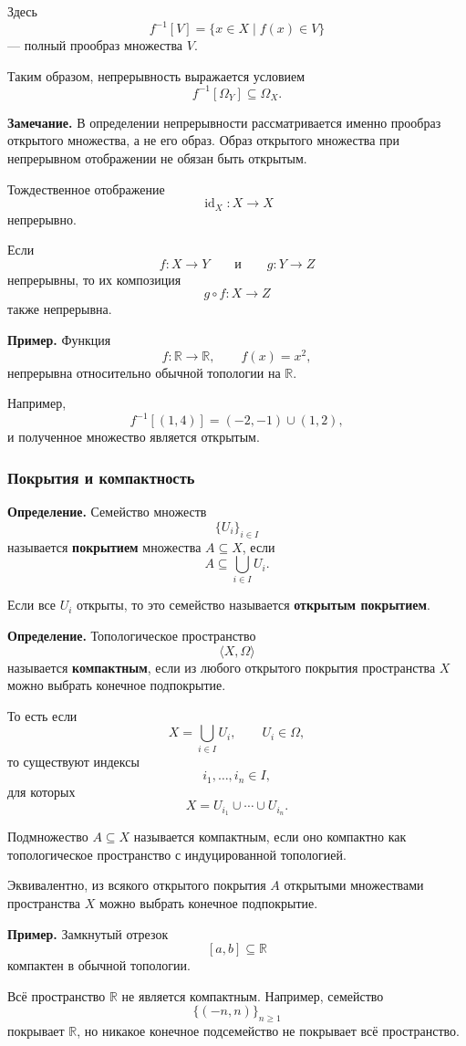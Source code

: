 \documentclass[12pt,a4paper,oneside,openany]{book}
\theoremstyle{definition}
\theoremstyle{plain}
\theoremstyle{remark}
\begin{document}
Здесь
\[
f^{-1}[V]
=
\{x\in X\mid f(x)\in V\}
\]
--- полный прообраз множества \(V\).

Таким образом, непрерывность выражается условием
\[
f^{-1}[\Omega_Y]\subseteq\Omega_X.
\]

\textbf{Замечание.}
В определении непрерывности рассматривается именно прообраз открытого
множества, а не его образ. Образ открытого множества при непрерывном
отображении не обязан быть открытым.

Тождественное отображение
\[
\operatorname{id}_X:X\to X
\]
непрерывно.

Если
\[
f:X\to Y
\qquad\text{и}\qquad
g:Y\to Z
\]
непрерывны, то их композиция
\[
g\circ f:X\to Z
\]
также непрерывна.

\textbf{Пример.}
Функция
\[
f:\mathbb R\to\mathbb R,
\qquad
f(x)=x^2,
\]
непрерывна относительно обычной топологии на \(\mathbb R\).

Например,
\[
f^{-1}[(1,4)]
=
(-2,-1)\cup(1,2),
\]
и полученное множество является открытым.

\subsubsection{Покрытия и компактность}

\textbf{Определение.}
Семейство множеств
\[
\{U_i\}_{i\in I}
\]
называется \textbf{покрытием} множества \(A\subseteq X\), если
\[
A\subseteq\bigcup_{i\in I}U_i.
\]

Если все \(U_i\) открыты, то это семейство называется
\textbf{открытым покрытием}.

\textbf{Определение.}
Топологическое пространство
\[
\langle X,\Omega\rangle
\]
называется \textbf{компактным}, если из любого открытого покрытия
пространства \(X\) можно выбрать конечное подпокрытие.

То есть если
\[
X=\bigcup_{i\in I}U_i,
\qquad
U_i\in\Omega,
\]
то существуют индексы
\[
i_1,\ldots,i_n\in I,
\]
для которых
\[
X
=
U_{i_1}\cup\cdots\cup U_{i_n}.
\]

Подмножество \(A\subseteq X\) называется компактным, если оно
компактно как топологическое пространство с индуцированной
топологией.

Эквивалентно, из всякого открытого покрытия \(A\) открытыми
множествами пространства \(X\) можно выбрать конечное подпокрытие.

\textbf{Пример.}
Замкнутый отрезок
\[
[a,b]\subseteq\mathbb R
\]
компактен в обычной топологии.

Всё пространство \(\mathbb R\) не является компактным. Например,
семейство
\[
\{(-n,n)\}_{n\geq 1}
\]
покрывает \(\mathbb R\), но никакое конечное подсемейство не покрывает
всё пространство.
\end{document}
